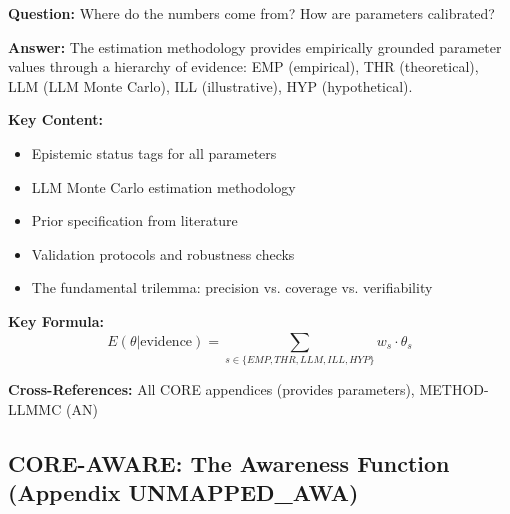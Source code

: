 \begin{tcolorbox}[colback=gray!5!white, colframe=gray!75!black]
\textbf{Question:} Where do the numbers come from? How are parameters calibrated?

\textbf{Answer:} The estimation methodology provides empirically grounded parameter
values through a hierarchy of evidence: EMP (empirical), THR (theoretical),
LLM (LLM Monte Carlo), ILL (illustrative), HYP (hypothetical).

\textbf{Key Content:}
\begin{itemize}[nosep]
\item Epistemic status tags for all parameters
\item LLM Monte Carlo estimation methodology
\item Prior specification from literature
\item Validation protocols and robustness checks
\item The fundamental trilemma: precision vs. coverage vs. verifiability
\end{itemize}

\textbf{Key Formula:}
\begin{equation}
E(\theta | \text{evidence}) = \sum_{s \in \{EMP, THR, LLM, ILL, HYP\}} w_s \cdot \hat{\theta}_s
\end{equation}

\textbf{Cross-References:} All CORE appendices (provides parameters), METHOD-LLMMC (AN)
\end{tcolorbox}

\subsection{CORE-AWARE: The Awareness Function (Appendix UNMAPPED_AWA)}

